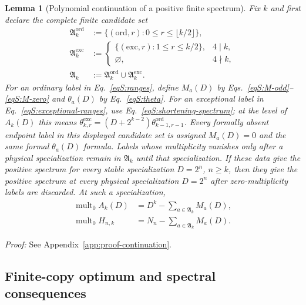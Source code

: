\documentclass[journal,twocolumn]{IEEEtran}
\newtheorem{lemma}[theorem]{Lemma}
\theoremstyle{definition}
\theoremstyle{plain}
\newcommand{\Ord}{\mathrm{ord}}
\newcommand{\Exc}{\mathrm{exc}}
\begin{document}
\begin{lemma}[Polynomial continuation of a positive finite spectrum]
\label{lemS:polynomial-continuation}
Fix $k$ and first declare the complete finite candidate set
\begin{equation*}
 \begin{aligned}
 \mathfrak A_k^{\Ord}
  &:=\{(\Ord,r):0\leq r\leq\lfloor k/2\rfloor\},\\
 \mathfrak A_k^{\Exc}
  &:=\begin{cases}
      \{(\Exc,r):1\leq r\leq k/2\},&4\mid k,\\
      \varnothing,&4\nmid k,
     \end{cases}\\
 \mathfrak A_k&:=\mathfrak A_k^{\Ord}\cup\mathfrak A_k^{\Exc}.
 \end{aligned}
\end{equation*}
For an ordinary label in Eq.~\eqref{eqS:ranges}, define $M_a(D)$ by
Eqs.~\eqref{eqS:M-odd}--\eqref{eqS:M-zero} and $\theta_a(D)$ by
Eq.~\eqref{eqS:theta}.  For an exceptional label in
Eq.~\eqref{eqS:exceptional-ranges}, use
Eq.~\eqref{eqS:shortening-spectrum}; at the level of $A_k(D)$ this means
$\theta^{\Exc}_{k,r}=(D+2^{k-2})\theta^{\Ord}_{k-1,r-1}$.  Every formally
absent endpoint label in this displayed candidate set is assigned
$M_a(D)=0$ and the same formal $\theta_a(D)$ formula.  Labels whose
multiplicity vanishes only after a physical specialization remain in
$\mathfrak A_k$ until that specialization.  If these data give the positive
spectrum for every stable specialization $D=2^n$, $n\geq k$, then they give
the positive spectrum at every physical specialization $D=2^n$ after
zero-multiplicity labels are discarded.  At such a specialization,
\begin{align}
 \operatorname{mult}_0 A_k(D)&=D^k-\sum_{a\in\mathfrak A_k}M_a(D),
 \label{eqS:A-zero-multiplicity}\\
 \operatorname{mult}_0 H_{n,k}&=N_n-\sum_{a\in\mathfrak A_k}M_a(D).
 \label{eqS:H-zero-multiplicity}
\end{align}
\end{lemma}

\noindent\emph{Proof:} See Appendix~\ref{app:proof-continuation}.\par

\subsection{Finite-copy optimum and spectral consequences}
\end{document}
